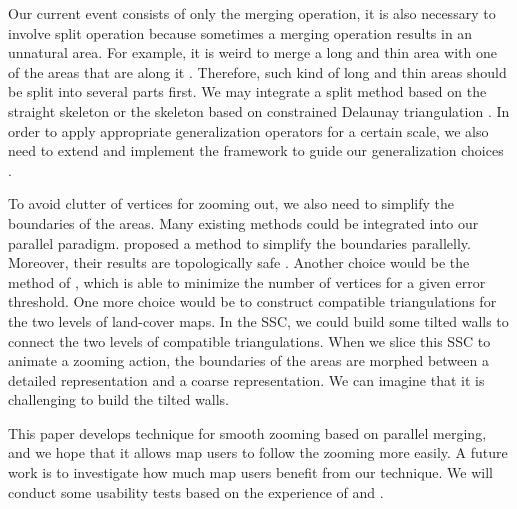 \documentclass[ijgi,article,submit,moreauthors,pdftex]{Definitions/mdpi}
\begin{document}
Our current event consists of only the merging operation,
it is also necessary to involve split operation
because sometimes a merging operation results in an unnatural area.
For example, it is weird to merge a long and thin area 
with one of the areas that are along it
\citep[see][]{Haunert2008Skeleton}.
Therefore, such kind of long and thin areas should be
split into several parts first.
We may integrate a split method based on the straight skeleton
\citep{Haunert2008Skeleton}
or the skeleton based on constrained Delaunay triangulation
\citep{Meijers2016Split}.
In order to apply appropriate generalization operators
for a certain scale,
we also need to extend and implement the framework 
to guide our generalization choices
\citep{Meijers2018Framework}.

To avoid clutter of vertices for zooming out, 
we also need to simplify the boundaries of the areas.
Many existing methods could be integrated into our parallel paradigm.
\citet{Meijers2011LineSimp} proposed a method 
to simplify the boundaries parallelly. 
Moreover, their results are topologically safe . 
Another choice would be the method of \citet{ImaiIri1988},
which is able to minimize the number of vertices 
for a given error threshold.
One more choice would be to construct compatible triangulations 
\citep[see][]{Peng2019Thesis}
for the two levels of land-cover maps.
In the SSC, we could build some tilted walls 
to connect the two levels of compatible triangulations.
When we slice this SSC to animate a zooming action,
the boundaries of the areas are morphed 
between a detailed representation and a coarse representation.
We can imagine that it is challenging to build the tilted walls.

This paper develops technique for smooth zooming based on parallel merging,
and we hope that it allows map users to follow the zooming more easily.
A future work is to investigate 
how much map users benefit from our technique.
We will conduct some usability tests based on the experience of
\citet[]{Suba2017Thesis} and \citet{Midtbo2007}.




\end{document}
